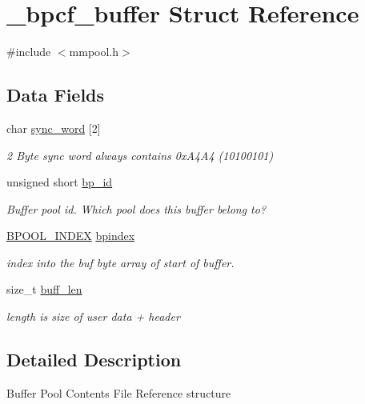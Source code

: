 \hypertarget{struct__bpcf__buffer}{\section{\-\_\-bpcf\-\_\-buffer Struct Reference}
\label{struct__bpcf__buffer}
}


{\ttfamily \#include $<$mmpool.\-h$>$}

\subsection*{Data Fields}
\begin{DoxyCompactItemize}
\item 
char \hyperlink{struct__bpcf__buffer_a3eba3ce7c4d0575db2fdc15293233b18}{sync\-\_\-word} \mbox{[}2\mbox{]}
\begin{DoxyCompactList}\small\item\em 2 Byte sync word always contains 0x\-A4\-A4 (10100101) \end{DoxyCompactList}\item 
unsigned short \hyperlink{struct__bpcf__buffer_ae67b46be019334905e0dccdf8415174d}{bp\-\_\-id}
\begin{DoxyCompactList}\small\item\em Buffer pool id. Which pool does this buffer belong to? \end{DoxyCompactList}\item 
\hyperlink{mmpool_8h_af9c89c63e54c678d57572603a97df34d}{B\-P\-O\-O\-L\-\_\-\-I\-N\-D\-E\-X} \hyperlink{struct__bpcf__buffer_a91e58d5ff6c3d739d694d1516619f9cc}{bpindex}
\begin{DoxyCompactList}\small\item\em index into the buf byte array of start of buffer. \end{DoxyCompactList}\item 
size\-\_\-t \hyperlink{struct__bpcf__buffer_a0a22f05ad0836231e9b3b8db6da29d0f}{buff\-\_\-len}
\begin{DoxyCompactList}\small\item\em length is size of user data + header \end{DoxyCompactList}\end{DoxyCompactItemize}


\subsection{Detailed Description}
Buffer Pool Contents File Reference structure 

